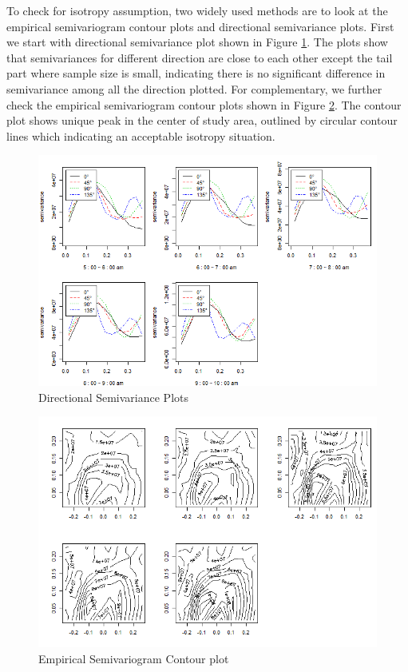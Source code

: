 \documentclass[hidelinks,12pt]{article}
\begin{document}
To check for isotropy assumption, two widely used methods are to look at the empirical semivariogram contour plots and directional semivariance plots. First we start with directional semivariance plot shown in Figure \ref{fig:dir_semi}. The plots show that semivariances for different direction are close to each other except the tail part where sample size is small, indicating there is no significant difference in semivariance among all the direction plotted. For complementary, we further check the empirical semivariogram contour plots shown in Figure \ref{fig:esc}. The contour plot shows unique peak in the center of study area, outlined by circular contour lines which indicating an acceptable isotropy situation.

\begin{figure}[!ht]
		\includegraphics[width=\textwidth]{dir_semi.png}
		\caption{Directional Semivariance Plots\label{fig:dir_semi}}
\end{figure}
\FloatBarrier

\begin{figure}[!ht]
		\includegraphics[width=\textwidth]{esc.png}
		\caption{Empirical Semivariogram Contour plot\label{fig:esc}}
\end{figure}
\FloatBarrier
\end{document}
